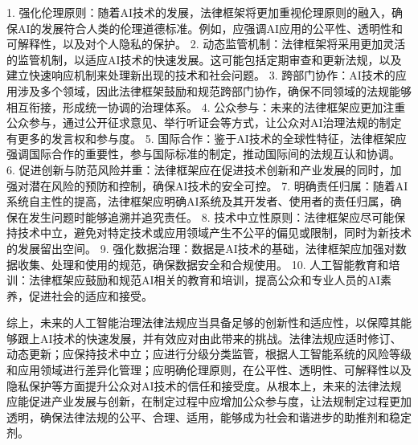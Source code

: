 1. 强化伦理原则：随着AI技术的发展，法律框架将更加重视伦理原则的融入，确保AI的发展符合人类的伦理道德标准。例如，应强调AI应用的公平性、透明性和可解释性，以及对个人隐私的保护。
2. 动态监管机制：法律框架将采用更加灵活的监管机制，以适应AI技术的快速发展。这可能包括定期审查和更新法规，以及建立快速响应机制来处理新出现的技术和社会问题。
3. 跨部门协作：AI技术的应用涉及多个领域，因此法律框架鼓励和规范跨部门协作，确保不同领域的法规能够相互衔接，形成统一协调的治理体系。
4. 公众参与：未来的法律框架应更加注重公众参与，通过公开征求意见、举行听证会等方式，让公众对AI治理法规的制定有更多的发言权和参与度。
5. 国际合作：鉴于AI技术的全球性特征，法律框架应强调国际合作的重要性，参与国际标准的制定，推动国际间的法规互认和协调。
6. 促进创新与防范风险并重：法律框架应在促进技术创新和产业发展的同时，加强对潜在风险的预防和控制，确保AI技术的安全可控。
7. 明确责任归属：随着AI系统自主性的提高，法律框架应明确AI系统及其开发者、使用者的责任归属，确保在发生问题时能够追溯并追究责任。
8. 技术中立性原则：法律框架应尽可能保持技术中立，避免对特定技术或应用领域产生不公平的偏见或限制，同时为新技术的发展留出空间。
9. 强化数据治理：数据是AI技术的基础，法律框架应加强对数据收集、处理和使用的规范，确保数据安全和合规使用。
10. 人工智能教育和培训：法律框架应鼓励和规范AI相关的教育和培训，提高公众和专业人员的AI素养，促进社会的适应和接受。

综上，未来的人工智能治理法律法规应当具备足够的创新性和适应性，以保障其能够跟上AI技术的快速发展，并有效应对由此带来的挑战。法律法规应适时修订、动态更新；应保持技术中立；应进行分级分类监管，根据人工智能系统的风险等级和应用领域进行差异化管理；应明确伦理原则，在公平性、透明性、可解释性以及隐私保护等方面提升公众对AI技术的信任和接受度。从根本上，未来的法律法规应能促进产业发展与创新，在制定过程中应增加公众参与度，让法规制定过程更加透明，确保法律法规的公平、合理、适用，能够成为社会和谐进步的助推剂和稳定剂。
